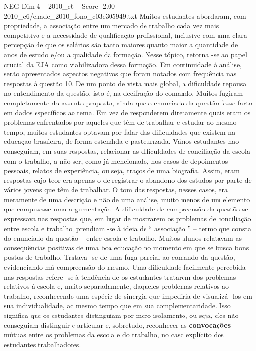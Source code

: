 \begin{textsample}{NEG Dim 4 – 2010\_c6 – Score -2.00 – 2010\_c6/enade\_2010\_fono\_c03e305949.txt}
Muitos estudantes abordaram, com propriedade, a associação entre um mercado de trabalho cada vez mais competitivo e a necessidade de qualificação profissional, inclusive com uma clara percepção de que os salários são tanto maiores quanto maior a quantidade de anos de estudo e/ou a qualidade da formação.
Nesse tópico, retorna -se ao papel crucial da EJA como viabilizadora dessa formação.
Em continuidade à análise, serão apresentados aspectos negativos que foram notados com frequência nas respostas à questão 10.
De um ponto de vista mais global, a dificuldade repousa no entendimento da questão, isto é, na decifração do comando.
Muitos fugiram completamente do assunto proposto, ainda que o enunciado da questão fosse farto em dados específicos ao tema.
Em vez de responderem diretamente quais eram os problemas enfrentados por aqueles que têm de trabalhar e estudar ao mesmo tempo, muitos estudantes optavam por falar das dificuldades que existem na educação brasileira, de forma estendida e pasteurizada.
Vários estudantes não conseguiam, em suas respostas, relacionar as dificuldades de conciliação da escola com o trabalho, a não ser, como já mencionado, nos casos de depoimentos pessoais, relatos de experiência, ou seja, traços de uma biografia.
Assim, eram respostas cujo teor era apenas o de registrar o abandono dos estudos por parte de vários jovens que têm de trabalhar.
O tom das respostas, nesses casos, era meramente de uma descrição e não de uma análise, muito menos de um elemento que compusesse uma argumentação.
A dificuldade de compreensão da questão se expressava nas respostas que, em lugar de mostrarem os problemas de conciliação entre escola e trabalho, prendiam -se à ideia de “ associação ” – termo que consta do enunciado da questão – entre escola e trabalho.
Muitos alunos relatavam as consequências positivas de uma boa educação no momento em que se busca bons postos de trabalho.
Tratava -se de uma fuga parcial ao comando da questão, evidenciando má compreensão do mesmo.
Uma dificuldade facilmente percebida nas respostas refere -se à tendência de os estudantes tratarem dos problemas relativos à escola e, muito separadamente, daqueles problemas relativos ao trabalho, reconhecendo uma espécie de sinergia que impediria de visualizá -los em sua individualidade, ao mesmo tempo que em sua complementaridade.
Isso significa que os estudantes distinguiam por mero isolamento, ou seja, eles não conseguiam distinguir e articular e, sobretudo, reconhecer as \textbf{convocações} mútuas entre os problemas da escola e do trabalho, no caso explícito dos estudantes trabalhadores.

\end{textsample}
